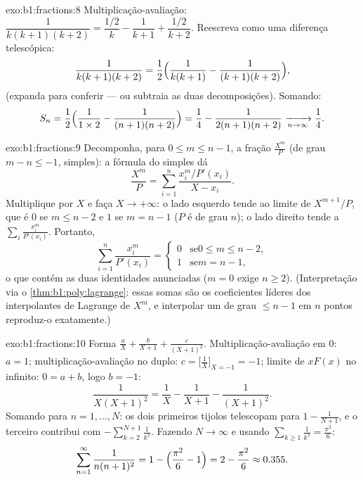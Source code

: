 \begin{solution}{exo:b1:fractions:8}
Multiplicação-avaliação: $\dfrac{1}{k(k+1)(k+2)} = \dfrac{1/2}{k} - \dfrac{1}{k+1} +
\dfrac{1/2}{k+2}$. Reescreva como uma diferença telescópica:
\[
\frac{1}{k(k+1)(k+2)}
= \frac12\Bigl(\frac{1}{k(k+1)} - \frac{1}{(k+1)(k+2)}\Bigr),
\]
(expanda para conferir --- ou subtraia as duas decomposições). Somando:
\[
S_n = \frac12\Bigl(\frac{1}{1 \times 2} - \frac{1}{(n+1)(n+2)}\Bigr)
= \frac14 - \frac{1}{2(n+1)(n+2)}
\xrightarrow[n \to \infty]{} \frac14 .
\]
\end{solution}

\begin{solution}{exo:b1:fractions:9}
Decomponha, para $0 \leq m \leq n - 1$, a fração $\frac{X^m}{P}$
(de grau $m - n \leq -1$,  simples): a fórmula do  simples dá
\[
\frac{X^m}{P} = \sum_{i=1}^{n} \frac{x_i^m / P'(x_i)}{X - x_i} .
\]
Multiplique por $X$ e faça $X \to +\infty$: o lado esquerdo tende ao
limite de $X^{m+1}/P$, que é $0$ se $m \leq n - 2$ e $1$ se $m =
n - 1$ ($P$ é  de grau $n$); o lado direito tende a
$\sum_i \frac{x_i^m}{P'(x_i)}$. Portanto,
\[
\sum_{i=1}^{n} \frac{x_i^{m}}{P'(x_i)} =
\begin{cases}
0 & \text{se} 0 \leq m \leq n-2,\\
1 & \text{se} m = n - 1,
\end{cases}
\]
o que contém as duas identidades anunciadas ($m = 0$ exige $n \geq
2$). (Interpretação via o \cref{thm:b1:poly:lagrange}: essas somas são
os coeficientes líderes dos interpolantes de Lagrange de $X^m$, e
interpolar um  de grau $\leq n-1$ em $n$ pontos
reproduz-o exatamente.)
\end{solution}

\begin{solution}{exo:b1:fractions:10}
Forma $\frac aX + \frac b{X+1} + \frac c{(X+1)^2}$. Multiplicação-avaliação em
$0$: $a = 1$; multiplicação-avaliação no  duplo: $c = \bigl[\frac1X
\bigr]_{X=-1} = -1$; limite de $xF(x)$ no infinito: $0 = a + b$, logo
$b = -1$:
\[
\frac{1}{X(X+1)^2} = \frac1X - \frac1{X+1} - \frac1{(X+1)^2} .
\]
Somando para $n = 1, \dots, N$: os dois primeiros tijolos telescopam para
$1 - \frac1{N+1}$, e o terceiro contribui com $-\sum_{k=2}^{N+1}
\frac1{k^2}$. Fazendo $N \to \infty$ e usando $\sum_{k\geq1}
\frac1{k^2} = \frac{\pi^2}6$:
\[
\sum_{n=1}^{\infty}\frac{1}{n(n+1)^2}
= 1 - \Bigl(\frac{\pi^2}6 - 1\Bigr) = 2 - \frac{\pi^2}6
\approx 0.355 .
\]
\end{solution}

